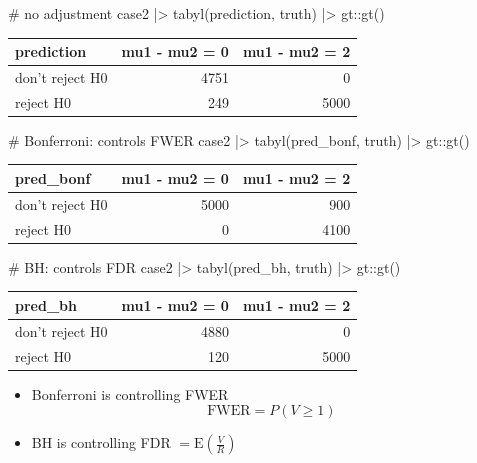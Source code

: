 \documentclass[a4paper]{article}
\begin{document}
\begin{Schunk}
\begin{Sinput}
# no adjustment
case2 |> tabyl(prediction, truth) |>
  gt::gt()
\end{Sinput}
\begin{longtable}{lrr}
\toprule
prediction & mu1 - mu2 = 0 & mu1 - mu2 = 2 \\ 
\midrule\addlinespace[2.5pt]
don't reject H0 & 4751 & 0 \\ 
reject H0 & 249 & 5000 \\ 
\bottomrule
\end{longtable}
\begin{Sinput}
# Bonferroni: controls FWER 
case2 |> tabyl(pred_bonf, truth) |>
  gt::gt()
\end{Sinput}
\begin{longtable}{lrr}
\toprule
pred\_bonf & mu1 - mu2 = 0 & mu1 - mu2 = 2 \\ 
\midrule\addlinespace[2.5pt]
don't reject H0 & 5000 & 900 \\ 
reject H0 & 0 & 4100 \\ 
\bottomrule
\end{longtable}
\begin{Sinput}
# BH: controls FDR 
case2 |> tabyl(pred_bh, truth) |>
  gt::gt()
\end{Sinput}
\begin{longtable}{lrr}
\toprule
pred\_bh & mu1 - mu2 = 0 & mu1 - mu2 = 2 \\ 
\midrule\addlinespace[2.5pt]
don't reject H0 & 4880 & 0 \\ 
reject H0 & 120 & 5000 \\ 
\bottomrule
\end{longtable}
\end{Schunk}
\begin{itemize}
	\item Bonferroni is controlling FWER
	\[
		\mathrm{FWER} = P(V \geq 1)
	\]
	\item BH is controlling FDR \( = \mathrm{E} \left( \frac{V}{R} \right) \) 
\end{itemize}
\end{document}
